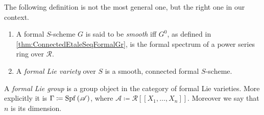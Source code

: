 \noindent
The following definition is not the most general one, but
the right one in our context.
\begin{defn}\leavevmode\vspace{-1\baselineskip}
\begin{enumerate}
	\item A formal $S$-scheme $G$ is said to be \emph{smooth} iff
		$G^0$, as defined in \cref{thm:ConnectedEtaleSeqFormalGr},
		is the formal spectrum of a power series ring over $\mathscr{R}$.
	\item A \emph{formal Lie variety} over $S$ is a smooth, connected formal $S$-scheme.
\end{enumerate}
\end{defn}


\begin{defn}\label{defn:FormalSchemeFormalLieGroup}
	A \emph{formal Lie group} is a group object in the category of
	formal Lie varieties.
	More explicitly it is $\Gamma \coloneqq \operatorname{Spf}\left( \mathscr{A} \right)$,
	where $\mathscr{A} \coloneqq \mathscr{R} [\![ X_1, \ldots, X_{ n } ]\!]$.
	Moreover we say that $n$ is its dimension. 
\end{defn}


